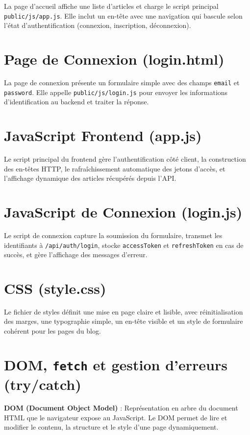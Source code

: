 \documentclass[a4paper,12pt]{book}
\begin{document}
La page d'accueil affiche une liste d'articles et charge le script principal \texttt{public/js/app.js}. Elle inclut un en-tête avec une navigation qui bascule selon l'état d'authentification (connexion, inscription, déconnexion).

\section{Page de Connexion (login.html)}

La page de connexion présente un formulaire simple avec des champs \texttt{email} et \texttt{password}. Elle appelle \texttt{public/js/login.js} pour envoyer les informations d'identification au backend et traiter la réponse.

\section{JavaScript Frontend (app.js)}

Le script principal du frontend gère l'authentification côté client, la construction des en-têtes HTTP, le rafraîchissement automatique des jetons d'accès, et l'affichage dynamique des articles récupérés depuis l'API.

\section{JavaScript de Connexion (login.js)}

Le script de connexion capture la soumission du formulaire, transmet les identifiants à \texttt{/api/auth/login}, stocke \texttt{accessToken} et \texttt{refreshToken} en cas de succès, et gère l'affichage des messages d'erreur.

\section{CSS (style.css)}

Le fichier de styles définit une mise en page claire et lisible, avec réinitialisation des marges, une typographie simple, un en-tête visible et un style de formulaire cohérent pour les pages du blog.

\section{DOM, \texttt{fetch} et gestion d'erreurs (try/catch)}

\begin{definitionbox}
    \textbf{DOM (Document Object Model)} : Repr\'esentation en arbre du document HTML que le navigateur expose au JavaScript. Le DOM permet de lire et modifier le contenu, la structure et le style d'une page dynamiquement.
\end{definitionbox}
\end{document}
